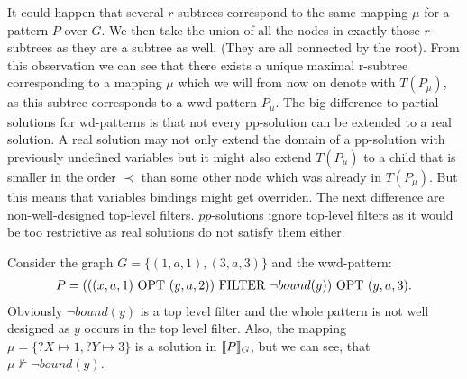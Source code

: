 It could happen that several $r$-subtrees correspond to the same mapping $\mu$
for a pattern $P$ over $G$. We then take the union of all the nodes in exactly
those $r$-subtrees as they are a subtree as well. (They are all connected by the root). 
From this observation we can see that there exists a unique maximal r-subtree
corresponding to a mapping $\mu$ which we will from now on denote with
$T(P_\mu)$, as this subtree corresponds to a wwd-pattern $P_\mu$. The
big difference to partial solutions for wd-patterns is that not every pp-solution can be
extended to a real solution. A real solution may not only extend the domain of a pp-solution
with previously undefined variables but it might also extend $T(P_\mu)$ to a
child that is smaller in the order $\prec$ than some other node which was
already in $T(P_\mu)$. But this means that variables bindings might get
overriden. The next difference are non-well-designed top-level filters.
$pp$-solutions ignore top-level filters as it would be too restrictive as real
solutions do not satisfy them either. 

\begin{example}
	Consider the graph $G = \{(1,a,1), (3,a,3)\}$ and the wwd-pattern:
	\begin{align*}
		P = (((x,a,1) \mbox{ OPT } (y,a,2)) \mbox{ FILTER } \neg bound(y)) \mbox{ OPT } (y,a,3).
	\end{align*}
	Obviously $\neg bound(y)$ is a top level filter and the whole pattern is
	not well designed as $y$ occurs in the top level filter.
	Also, the mapping $\mu = \{?X \mapsto 1, ?Y \mapsto 3\}$ is a solution in
	$\llbracket P \rrbracket_G$, but we can see, that $\mu \not\models \neg bound(y)$.
\end{example}

